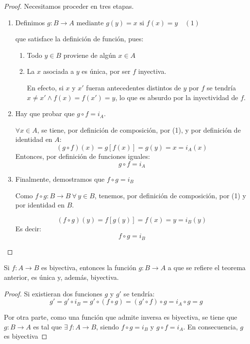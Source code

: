 \begin{enumerate}
	\begin{proof}
		Necesitamos proceder en tres etapas.
		
		\begin{enumerate}[label=\textbf{\alph*)}]
			\item Definimos
			$g: B \rightarrow A \mbox{ mediante } g(y)= x \mbox{ si } f(x) = y
			\quad (1)$
			
			que satisface la definición de función, pues:
			\begin{enumerate}[label=\roman*), ref=\roman*]
				\item Todo $y \in B$ proviene de algún $x \in A$
				\item La $x$ asociada a $y$ es única, por ser $f$ inyectiva.
				
				En efecto, si $x$ y $x'$ fueran antecedentes distintos de $y$ por $f$
				se tendría $x \ne x' \land f(x) = f(x') = y$, lo que es absurdo por la
				inyectividad de $f$.
			\end{enumerate}
		\item Hay que probar que $g \circ f = i_A$.
		
		$\forall x \in A$, se tiene, por definición de composición, por (1), y
		por definición de identidad en $A$:
		\[ (g \circ  f)(x) = g[f(x)] = g(y) = x = i_A(x)\]
		Entonces, por definición de funciones iguales:
		\[ g \circ f = i_A \]

		\item Finalmente, demostramos que $f \circ g = i_B$
		
		Como $f \circ g: B \rightarrow B \ \forall \, y \in B$, tenemos, por definición
		de composición, por (1) y por identidad en $B$.
		
		\[ (f \circ g)(y) = f[g(y)] = f(x) = y = i_B(y) \]
		Es decir:
		\[ f \circ g = i_B \]
	\end{enumerate}
\end{proof}
\end{enumerate}

\begin{mdframed}[backgroundcolor=gray!20, linecolor=black, linewidth=1pt,
	frametitle={Consecuencia}]
	Si $f: A \rightarrow B$ es biyectiva, entonces la función $g:B \rightarrow A$ a 
	que se refiere el teorema anterior, es única y, además, biyectiva.
\end{mdframed}
\begin{proof}
	Si existieran dos funciones $g$ y $g'$ se tendría:
	\[ g' = g' \circ i_B = g' \circ (f \circ g) = (g' \circ f) \circ g = 
	i_A \circ g = g \]
	
	Por otra parte, como una función que admite inversa es biyectiva, se tiene 
	que $g: B \rightarrow A$ es tal que $\exists \, f: A \rightarrow B$, siendo
	$f \circ g = i_B$ y $g \circ f = i_A$. En consecuencia, $g$ es biyectiva
\end{proof}

